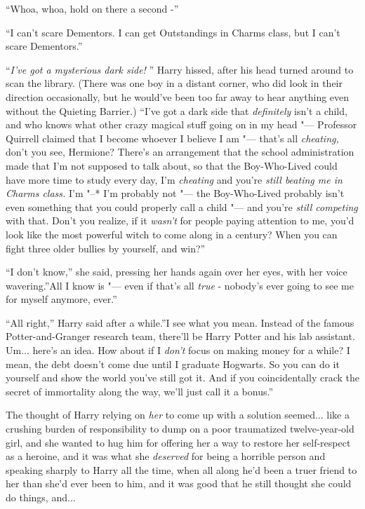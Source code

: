 ``Whoa, whoa, hold on there a second -''

``I can't scare Dementors. I can get Outstandings in Charms class, but I
can't scare Dementors.''

``\emph{I've got a mysterious dark side!} '' Harry hissed, after his head
turned around to scan the library. (There was one boy in a distant
corner, who did look in their direction occasionally, but he would've
been too far away to hear anything even without the Quieting Barrier.)
``I've got a dark side that \emph{definitely} isn't a child, and who
knows what other crazy magical stuff going on in my head "--- Professor
Quirrell claimed that I become whoever I believe I am "--- that's all
\emph{cheating,} don't you see, Hermione? There's an arrangement that
the school administration made that I'm not supposed to talk about, so
that the Boy-Who-Lived could have more time to study every day, I'm
\emph{cheating} and you're \emph{still beating me in Charms class.} I'm
"--* I'm probably not "--- the Boy-Who-Lived probably isn't even something
that you could properly call a child "--- and you're \emph{still competing}
with that. Don't you realize, if it \emph{wasn't} for people paying
attention to me, you'd look like the most powerful witch to come along
in a century? When you can fight three older bullies by yourself, and
win?''

``I don't know,'' she said, pressing her hands again over her eyes, with
her voice wavering.''All I know is "--- even if that's all \emph{true} -
nobody's ever going to see me for myself anymore, ever.''

``All right,'' Harry said after a while.''I see what you mean. Instead
of the famous Potter-and-Granger research team, there'll be Harry Potter
and his lab assistant. Um... here's an idea. How about if I
\emph{don't} focus on making money for a while? I mean, the debt doesn't
come due until I graduate Hogwarts. So you can do it yourself and show
the world you've still got it. And if you coincidentally crack the
secret of immortality along the way, we'll just call it a bonus.''

The thought of Harry relying on \emph{her} to come up with a solution
seemed... like a crushing burden of responsibility to dump on a
poor traumatized twelve-year-old girl, and she wanted to hug him for
offering her a way to restore her self-respect as a heroine, and it was
what she \emph{deserved} for being a horrible person and speaking
sharply to Harry all the time, when all along he'd been a truer friend
to her than she'd ever been to him, and it was good that he still
thought she could do things, and...

